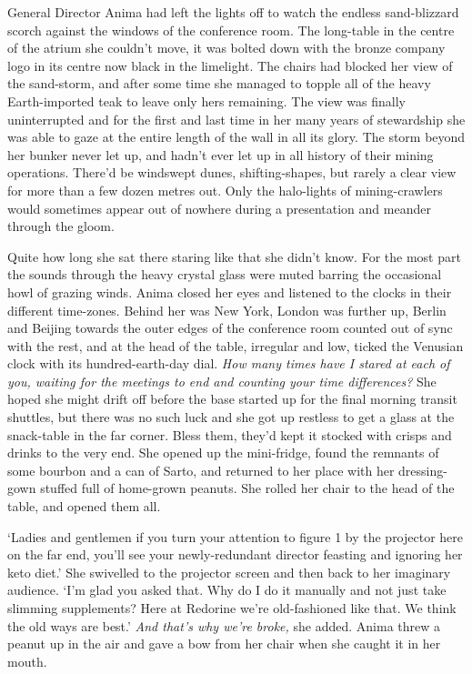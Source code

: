 General Director Anima had left the lights off to watch the endless
sand-blizzard scorch against the windows of the conference room. The
long-table in the centre of the atrium she couldn't move, it was
bolted down with the bronze company logo in its centre now black in
the limelight. The chairs had blocked her view of the sand-storm, and
after some time she managed to topple all of the heavy Earth-imported
teak to leave only hers remaining. The view was finally uninterrupted
and for the first and last time in her many years of stewardship she
was able to gaze at the entire length of the wall in all its
glory. The storm beyond her bunker never let up, and hadn't ever let
up in all history of their mining operations. There'd be windswept
dunes, shifting-shapes, but rarely a clear view for more than a few
dozen metres out. Only the halo-lights of mining-crawlers would
sometimes appear out of nowhere during a presentation and meander
through the gloom.

Quite how long she sat there staring like that she didn't know. For
the most part the sounds through the heavy crystal glass were muted
barring the occasional howl of grazing winds. Anima closed her eyes
and listened to the clocks in their different time-zones. Behind her
was New York, London was further up, Berlin and Beijing towards the
outer edges of the conference room counted out of sync with the rest,
and at the head of the table, irregular and low, ticked the Venusian
clock with its hundred-earth-day dial. \textit{How many times have I
 stared at each of you, waiting for the meetings to end and counting
 your time differences?} She hoped she might drift off before the
base started up for the final morning transit shuttles, but there was
no such luck and she got up restless to get a glass at the snack-table
in the far corner. Bless them, they'd kept it stocked with crisps and
drinks to the very end. She opened up the mini-fridge, found the
remnants of some bourbon and a can of Sarto, and returned to her place
with her dressing-gown stuffed full of home-grown peanuts. She rolled
her chair to the head of the table, and opened them all.

`Ladies and gentlemen if you turn your attention to figure 1 by the
projector here on the far end, you'll see your newly-redundant
director feasting and ignoring her keto diet.' She swivelled to the
projector screen and then back to her imaginary audience. `I'm glad
you asked that. Why do I do it manually and not just take slimming
supplements? Here at Redorine we're old-fashioned like that. We think
the old ways are best.' \textit{And that's why we're broke,} she
added. Anima threw a peanut up in the air and gave a bow from her
chair when she caught it in her mouth.


